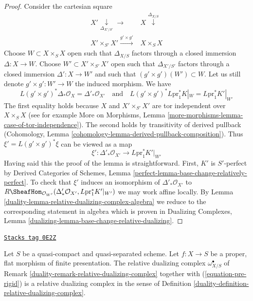 \begin{proof}

Consider the cartesian square
$$
\begin{array}{cc}X' \underset{\Delta_{X'/S'}}{\downarrow}\longrightarrow & X \overset{\Delta_{X/S}}{\downarrow} \\ X' \times_{S'} X' \overset{g' \times g'}{\longrightarrow} & X \times_S X\end{array}
$$
Choose $W \subset X \times_S X$ open such that $\Delta_{X/S}$
factors through a closed immersion $\Delta : X \to W$.
Choose $W' \subset X' \times_{S'} X'$ open such that $\Delta_{X'/S'}$
factors through a closed immersion $\Delta' : X \to W'$
and such that $(g' \times g')(W') \subset W$. Let us still denote
$g' \times g' : W' \to W$ the induced morphism. We have
$$
L(g' \times g')^*\Delta_*\mathcal{O}_X =
\Delta'_*\mathcal{O}_{X'}
\quad\text{and}\quad
L(g' \times g')^*L\text{pr}_1^*K|_W =
L\text{pr}_1^*K'|_{W'}
$$
The first equality holds because $X$ and $X' \times_{S'} X'$
are tor independent over $X \times_S X$ (see for example
More on Morphisms, Lemma \ref{more-morphisms-lemma-case-of-tor-independence}).
The second holds by transitivity of derived pullback
(Cohomology, Lemma \ref{cohomology-lemma-derived-pullback-composition}).
Thus $\xi' = L(g' \times g')^*\xi$ can be viewed as a map
$$
\xi' : \Delta'_*\mathcal{O}_{X'} \longrightarrow L\text{pr}_1^*K'|_{W'}
$$
Having said this the proof of the lemma is straightforward.
First, $K'$ is $S'$-perfect by Derived Categories of Schemes, Lemma
\ref{perfect-lemma-base-change-relatively-perfect}.
To check that $\xi'$ induces an isomorphism
of $\Delta'_*\mathcal{O}_{X'}$ to
$R\SheafHom_{\mathcal{O}_{W'}}(
\Delta'_*\mathcal{O}_{X'}, L\text{pr}_1^*K'|_{W'})$
we may work affine locally. By
Lemma \ref{duality-lemma-relative-dualizing-complex-algebra}
we reduce to the corresponding statement in algebra
which is proven in Dualizing Complexes, Lemma
\ref{dualizing-lemma-base-change-relative-dualizing}.
\end{proof}

\begin{lemma}
\label{duality-lemma-flat-proper-relative-dualizing}
\href{https://stacks.math.columbia.edu/tag/0E2Z}{\texttt{Stacks tag 0E2Z}}

Let $S$ be a quasi-compact and quasi-separated scheme.
Let $f : X \to S$ be a proper, flat morphism of finite presentation.
The relative dualizing complex $\omega_{X/S}^\bullet$ of
Remark \ref{duality-remark-relative-dualizing-complex}
together with (\ref{equation-pre-rigid}) is a relative
dualizing complex in the sense of
Definition \ref{duality-definition-relative-dualizing-complex}.
\end{lemma}

